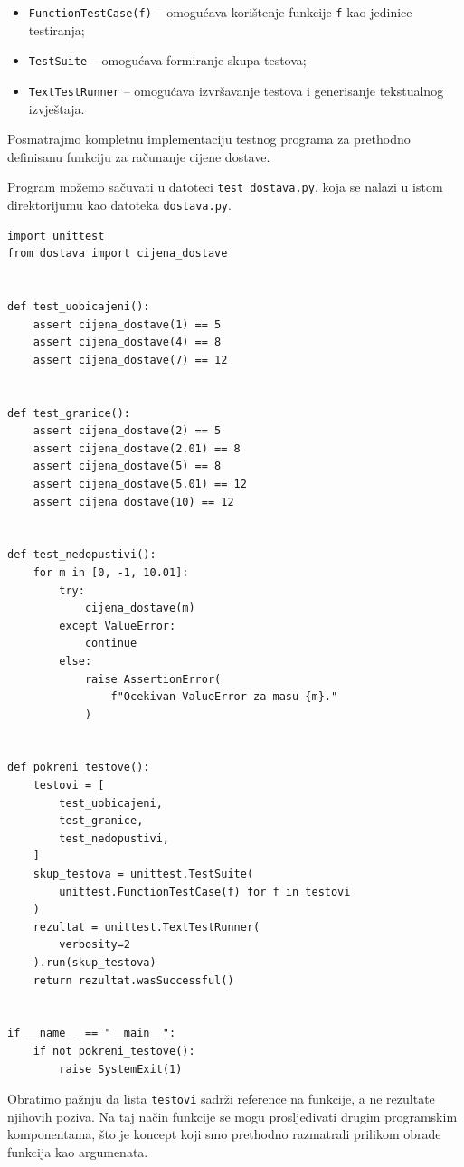 \begin{itemize}
	\item \texttt{FunctionTestCase(f)} -- omogućava 
	korištenje funkcije \texttt{f} kao jedinice testiranja;
	
	\item \texttt{TestSuite} -- omogućava formiranje 
	skupa testova;
	
	\item \texttt{TextTestRunner} -- omogućava 
	izvršavanje testova i generisanje tekstualnog 
	izvještaja.
\end{itemize}

Posmatrajmo kompletnu implementaciju testnog programa 
za prethodno definisanu funkciju za računanje cijene 
dostave.

Program možemo sačuvati u datoteci 
\texttt{test\_dostava.py}, koja se nalazi u istom 
direktorijumu kao datoteka \texttt{dostava.py}.

\begin{verbatim}
import unittest
from dostava import cijena_dostave


def test_uobicajeni():
    assert cijena_dostave(1) == 5
    assert cijena_dostave(4) == 8
    assert cijena_dostave(7) == 12


def test_granice():
    assert cijena_dostave(2) == 5
    assert cijena_dostave(2.01) == 8
    assert cijena_dostave(5) == 8
    assert cijena_dostave(5.01) == 12
    assert cijena_dostave(10) == 12


def test_nedopustivi():
    for m in [0, -1, 10.01]:
        try:
            cijena_dostave(m)
        except ValueError:
            continue
        else:
            raise AssertionError(
                f"Ocekivan ValueError za masu {m}."
            )


def pokreni_testove():
    testovi = [
        test_uobicajeni,
        test_granice,
        test_nedopustivi,
    ]
    skup_testova = unittest.TestSuite(
        unittest.FunctionTestCase(f) for f in testovi
    )
    rezultat = unittest.TextTestRunner(
        verbosity=2
    ).run(skup_testova)
    return rezultat.wasSuccessful()


if __name__ == "__main__":
    if not pokreni_testove():
        raise SystemExit(1)
\end{verbatim}

Obratimo pažnju da lista \texttt{testovi} sadrži 
reference na funkcije, a ne rezultate njihovih 
poziva. Na taj način funkcije se mogu prosljeđivati 
drugim programskim komponentama, što je koncept 
koji smo prethodno razmatrali prilikom obrade 
funkcija kao argumenata.

